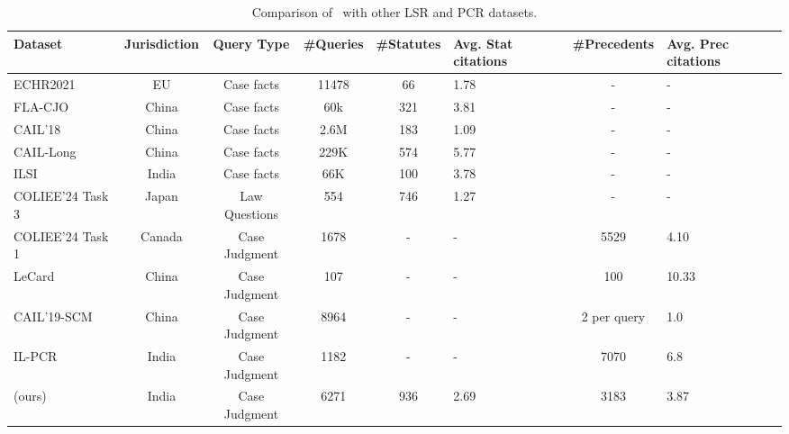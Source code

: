 \begin{table}
    \centering
    \small
    \begin{tabular}{p{}ccccp{}cp{}}
    \toprule
         \textbf{Dataset}& \textbf{Jurisdiction} &  \textbf{Query Type}&  \textbf{\#Queries}&  \textbf{\#Statutes}  & \textbf{Avg. Stat citations} &  \textbf{\#Precedents}  & \textbf{Avg. Prec citations}\\ \midrule
         ECHR2021& EU &  Case facts&  11478&  66 &1.78&  - &-\\
         FLA-CJO& China & Case facts&  60k&  321 &3.81&  - &-\\
         CAIL'18& China & Case facts&  2.6M&  183 &1.09&  - &-\\
 CAIL-Long& China & Case facts& 229K& 574 &5.77&- &-\\
 ILSI& India & Case facts& 66K& 100 &3.78&- &-\\
 COLIEE'24 Task 3& Japan & Law Questions& 554&746 &1.27 &- &-\\ \midrule
 COLIEE'24 Task 1& Canada & Case Judgment& 1678& - &-&5529 & 4.10\\
 LeCard& China & Case Judgment& 107& - &-&100 &10.33\\
 CAIL'19-SCM& China & Case Judgment& 8964& - &-&2 per query & 1.0\\
 IL-PCR & India & Case Judgment& 1182& - &-&7070 &6.8\\ \midrule
 \ilpcsr{} (ours) & India & Case Judgment& 6271& 936 &2.69&3183 &3.87\\ \bottomrule
    \end{tabular}
    \vspace{-3mm}
    \caption{Comparison of \ilpcsr\ with other LSR and PCR datasets.} %
    \label{tab:dataset_compare}
    \vspace{-5mm}
\end{table}




